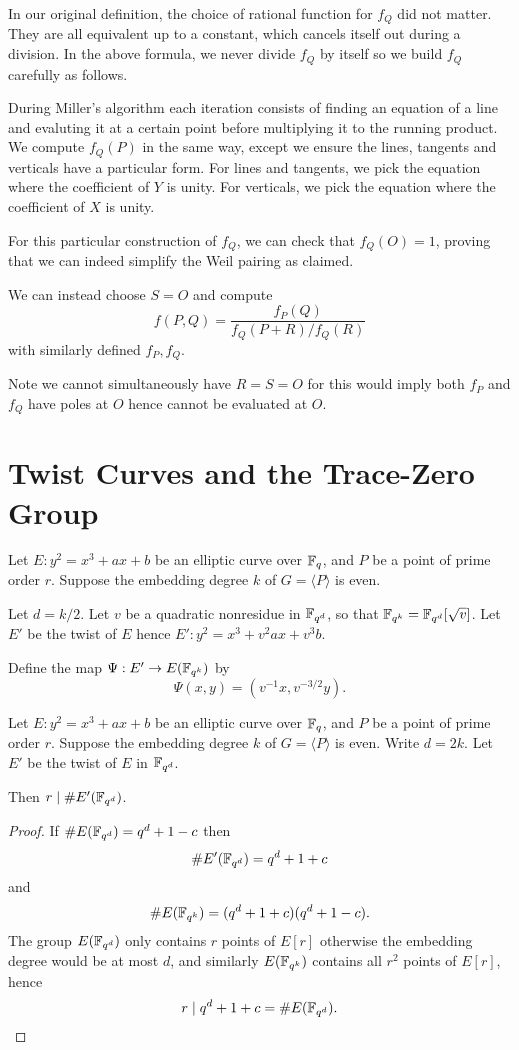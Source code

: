 In our original definition, the choice of rational function for $f_Q$
did not matter. They are all equivalent up to a constant,
which cancels itself out during a division. In the above formula,
we never divide $f_Q$ by itself so we build $f_Q$ carefully as follows.

During Miller's algorithm each iteration consists of finding an equation of
a line and evaluting it at a certain point before multiplying it to the
running product. We compute $f_Q(P)$ in the same way, except we ensure
the lines, tangents and verticals have a particular form. For lines and
tangents, we pick the equation where the coefficient of $Y$ is unity.
For verticals, we pick the equation where the coefficient of $X$ is unity.

For this particular construction of $f_Q$, we can check that $f_Q(O) = 1$,
proving that we can indeed simplify the Weil pairing as claimed.

We can instead choose $S = O$ and compute
\[ f(P,Q) = \frac{f_P(Q)}{f_Q(P+R)/f_Q(R)} \]
with similarly defined $f_P, f_Q$.

Note we cannot simultaneously have $R = S = O$ for this would imply
both $f_P$ and $f_Q$ have poles at $O$ hence cannot be evaluated at $O$.

\section {Twist Curves and the Trace-Zero Group}

Let $E : y^2 = x^3 + a x + b$ be an elliptic curve over $\mathbb{F}_q$,
and $P$ be a point of prime order $r$.
Suppose the embedding degree $k$ of $G = \langle P \rangle$ is even.

Let $d = k / 2$. Let $v$ be a quadratic nonresidue in $\mathbb{F}_{q^d}$,
so that $\mathbb{F}_{q^k} = \mathbb{F}_{q^d}[\sqrt{v}]$.
Let $E'$ be the twist of $E$ hence
$E' : y^2 = x^3 + v^2 a x + v^3 b$.

Define the map $\Psi:E'\rightarrow E(\mathbb{F}_{q^k})$ by
\[ \Psi(x,y) = (v^{-1}x, v^{-3/2}y) . \]

\begin{theorem}
Let $E : y^2 = x^3 + a x + b$ be an elliptic curve over $\mathbb{F}_q$,
and $P$ be a point of prime order $r$.
Suppose the embedding degree $k$ of $G = \langle P \rangle$ is even.
Write $d = 2k$. Let $E'$ be the twist of $E$ in $\mathbb{F}_{q^d}$.

Then $r \mid \#E'(\mathbb{F}_{q^d})$.
\end{theorem}

\begin{proof}
If $\#E(\mathbb{F}_{q^d}) = q^d + 1 - c$ then
\[ \#E'(\mathbb{F}_{q^d}) = q^d + 1 + c \]
and
\[ \#E(\mathbb{F}_{q^k}) = (q^{d} + 1 + c)(q^{d} + 1 - c) . \]
The group $E(\mathbb{F}_{q^d})$ only contains $r$ points of $E[r]$ otherwise
the embedding degree would be at most $d$, and similarly
$E(\mathbb{F}_{q^k})$ contains all $r^2$ points of $E[r]$,
hence
\[ r \mid q^{d} + 1 + c = \#E(\mathbb{F}_{q^d}) .\]
\end{proof}

